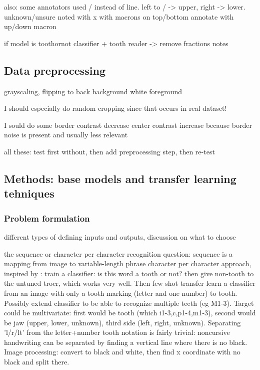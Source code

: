 \documentclass{article}
\begin{document}
also: some annotators used / instead of line. left to / -> upper, right -> lower.
unknown/unsure noted with x with macrons on top/bottom
annotate with up/down macron

if model is toothornot classifier + tooth reader -> remove fractions notes

\subsection{Data preprocessing}

grayscaling, flipping to back background white foreground

I should especially do random cropping since that occurs in real dataset!

I sould do some border contrast decrease center contrast increase because border noise is present and usually less relevant 

all these: test first without, then add preprocessing step, then re-test

\subsection{Methods: base models and transfer learning tehniques}

\subsubsection{Problem formulation}

different types of defining inputs and outputs, discussion on what to choose

the sequence or character per character recognition question:
sequence is a mapping from image to variable-length phrase
character per character approach, inspired by \cite{tibetan_ocr}:
train a classifier: is this word a tooth or not? then give non-tooth to the untuned
trocr, which works very well. Then few shot transfer learn a classifier from an image
with only a tooth marking (letter and one number) to tooth. Possibly extend classifier to 
be able to recognize multiple teeth (eg M1-3). Target could be multivariate: first would
be tooth (which i1-3,c,p1-4,m1-3), second would be jaw (upper, lower, unknown), third side 
(left, right, unknown). Separating 'l/r/lt' from the letter+number tooth notation is 
fairly trivial: noncursive handwriting can be separated by finding a vertical line where there 
is no black. Image processing: convert to black and white, then find x coordinate with no black 
and split there.
\end{document}
